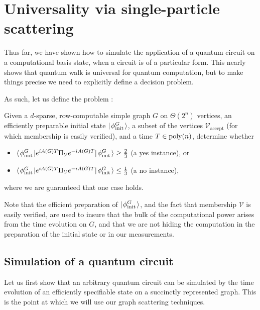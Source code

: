 \documentclass[../thesis-main/thesis-main]{subfiles}
\begin{document}


\section{Universality via single-particle scattering}



Thus far, we have shown how to simulate the application of a quantum circuit on a computational basis state, when a circuit is of a particular form.  This nearly shows that quantum walk is universal for quantum computation, but to make things precise we need to explicitly define a decision problem.

As such, let us define the problem \QWE:
\begin{problem}[\QWE] Given a $d$-sparse, row-computable simple graph $G$ on $\Theta(2^n)$ vertices, an efficiently preparable initial state $|\mspace{2mu} \phi_{\text{init}}^G \mspace{2mu} \rangle$, a subset of the vertices $\mathcal{V}_{\text{accept}}$ (for which membership is easily verified), and a time $T \in \operatorname{poly}(n)$, determine whether
\begin{itemize}
   \item $\langle\mspace{2mu} \phi_{\text{init}}^G \mspace{2mu} | e^{i A(G) T} \Pi_{\mathcal{V}} e^{-i A(G)T} |\mspace{2mu} \phi_{\text{init}}^G \mspace{2mu} \rangle \geq \frac{2}{3}$ (a yes instance), or
   \item $\langle\mspace{2mu} \phi_{\text{init}}^G \mspace{2mu} | e^{i A(G) T} \Pi_{\mathcal{V}} e^{-i A(G)T} |\mspace{2mu} \phi_{\text{init}}^G \mspace{2mu} \rangle \leq \frac{1}{3}$ (a no instance),
\end{itemize}
where we are guaranteed that one case holds.
\end{problem}

Note that the efficient preparation of $|\mspace{2mu} \phi_{\text{init}}^G \mspace{2mu} \rangle$, and the fact that membership $\mathcal{V}$ is easily verified, are used to insure that the bulk of the computational power arises from the time evolution on $G$, and that we are not hiding the computation in the preparation of the initial state or in our measurements.

\subsection{Simulation of a quantum circuit}

Let us first show that an arbitrary quantum circuit can be simulated by the time evolution of an efficiently specifiable state on a succinctly represented graph.  This is the point at which we will use our graph scattering techniques.  
\end{document}
